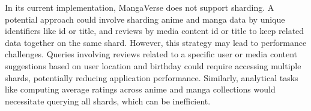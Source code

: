 \vspace{\baselineskip}

In its current implementation, MangaVerse does not support sharding. A potential approach could involve sharding
anime and manga data by unique identifiers like id or title, and reviews by media content id or title to keep
related data together on the same shard. However, this strategy may lead to performance challenges. Queries
involving reviews related to a specific user or media content suggestions based on user location and birthday
could require accessing multiple shards, potentially reducing application performance. Similarly, analytical
tasks like computing average ratings across anime and manga collections would necessitate querying all shards,
which can be inefficient.